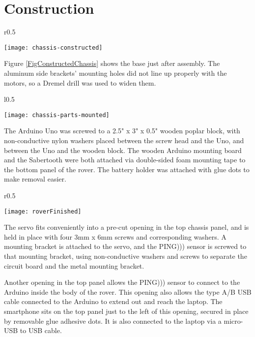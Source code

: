 \section{Construction}

\begin{wrapfigure}{r}{0.5\textwidth}
	\caption{Constructed Chassis}
	\centering
	\texttt{[image: chassis-constructed]}
	\label{FigConstructedChassis}
\end{wrapfigure}

Figure \ref{FigConstructedChassis} shows the base just after assembly. The aluminum side brackets' mounting holes did not line up properly with the motors, so a Dremel drill was used to widen them.

\begin{wrapfigure}{l}{0.5\textwidth}
	\caption{Pieces Mounted}
	\centering
	\texttt{[image: chassis-parts-mounted]}
	\label{FigChassisParts}
\end{wrapfigure}

The Arduino Uno was screwed to a 2.5" x 3" x 0.5" wooden poplar block, with non-conductive nylon washers placed between the screw head and the Uno, and between the Uno and the wooden block. The wooden Arduino mounting board and the Sabertooth were both attached via double-sided foam mounting tape to the bottom panel of the rover. The battery holder was attached with glue dots to make removal easier.

\begin{wrapfigure}{r}{0.5\textwidth}
	\caption{Construction Finished}
	\centering
	\texttt{[image: roverFinished]}
	\label{FigRoverFinished}
\end{wrapfigure}

The servo fits conveniently into a pre-cut opening in the top chassis panel, and is held in place with four 3mm x 6mm screws and corresponding washers. A mounting bracket is attached to the servo, and the PING))) sensor is screwed to that mounting bracket, using non-conductive washers and screws to separate the circuit board and the metal mounting bracket.

Another opening in the top panel allows the PING))) sensor to connect to the Arduino inside the body of the rover. This opening also allows the type A/B USB cable connected to the Arduino to extend out and reach the laptop. The smartphone sits on the top panel just to the left of this opening, secured in place by removable glue adhesive dots. It is also connected to the laptop via a micro-USB to USB cable.

